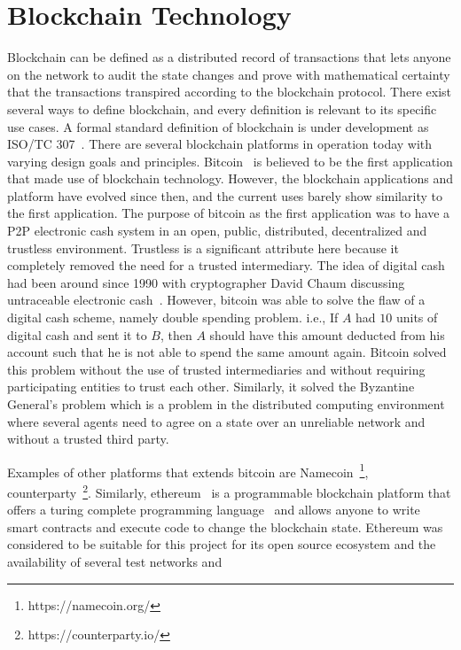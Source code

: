 \section{Blockchain Technology} \label{sec:blockchain}
Blockchain can be defined as a distributed record of transactions that lets
anyone on the network to audit the state changes and prove with mathematical
certainty that the transactions transpired according to the blockchain
protocol. There exist several ways to define blockchain, and every definition
is relevant to its specific use cases. A formal standard definition of
blockchain is under development as ISO/TC 307~\cite{ISOTC307}. There are
several blockchain platforms in operation today with varying design goals and
principles. Bitcoin~\cite{Bitcoin_Satoshi} is believed to be the first
application that made use of blockchain technology. However, the blockchain
applications and platform have evolved since then, and the current uses barely
show similarity to the first application. The purpose of bitcoin as the first
application was to have a P2P electronic cash system in an open, public,
distributed, decentralized and trustless environment. Trustless is a
significant attribute here because it completely removed the need for a trusted
intermediary. The idea of digital cash had been around since 1990 with
cryptographer David Chaum discussing untraceable electronic
cash~\cite{chaum1988untraceable}. However, bitcoin was able to solve the flaw
of a digital cash scheme, namely double spending problem. i.e., If $A$ had $10$
units of digital cash and sent it to $B$, then $A$ should have this amount
deducted from his account such that he is not able to spend the same amount
again. Bitcoin solved this problem without the use of trusted intermediaries
and without requiring participating entities to trust each other. Similarly, it
solved the Byzantine General's problem which is a problem in the distributed
computing environment where several agents need to agree on a state over an
unreliable network and without a trusted third party. \par
Examples of other platforms that extends bitcoin are
Namecoin~\footnote{https://namecoin.org/},
counterparty~\footnote{https://counterparty.io/}. Similarly,
ethereum~\cite{buterin2013ethereum} is a programmable blockchain platform that
offers a turing complete programming language~\cite{dannen2017introducing} and
allows anyone to write smart contracts and execute code to change the
blockchain state. Ethereum was considered to be suitable for this project for
its open source ecosystem and the availability of several test networks and

